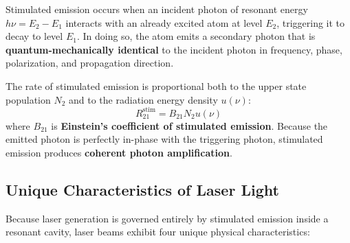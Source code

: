 \begin{definition}
Stimulated emission occurs when an incident photon of resonant energy $h\nu = E_2 - E_1$ interacts with an already excited atom at level $E_2$, triggering it to decay to level $E_1$. In doing so, the atom emits a secondary photon that is \textbf{quantum-mechanically identical} to the incident photon in frequency, phase, polarization, and propagation direction.
\end{definition}
The rate of stimulated emission is proportional both to the upper state population $N_2$ and to the radiation energy density $u(\nu)$:
\begin{equation}
    R_{21}^{\text{stim}} = B_{21} N_2 u(\nu)
\end{equation}
where $B_{21}$ is \textbf{Einstein's coefficient of stimulated emission}. Because the emitted photon is perfectly in-phase with the triggering photon, stimulated emission produces \textbf{coherent photon amplification}.

\subsection{Unique Characteristics of Laser Light}
Because laser generation is governed entirely by stimulated emission inside a resonant cavity, laser beams exhibit four unique physical characteristics:

